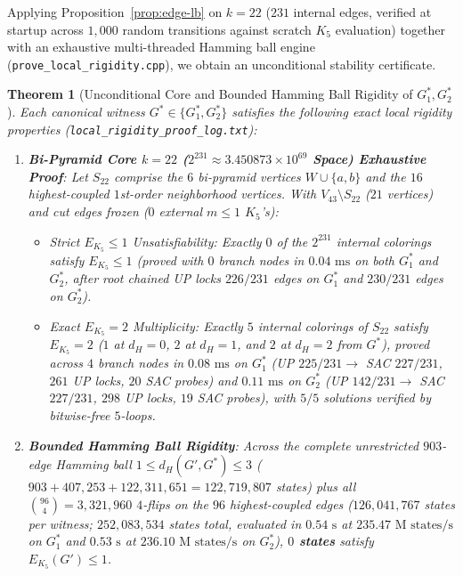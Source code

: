 \documentclass[11pt,a4paper]{article}
\theoremstyle{plain}
\newtheorem{theorem}{Theorem}[section]
\theoremstyle{definition}
\begin{document}
Applying Proposition~\ref{prop:edge-lb} on $k=22$ ($231$ internal edges, verified at startup across $1,000$ random transitions against scratch $K_5$ evaluation) together with an exhaustive multi-threaded Hamming ball engine (\texttt{prove\_\allowbreak local\_\allowbreak rigidity.cpp}), we obtain an unconditional stability certificate.

\begin{theorem}[Unconditional Core and Bounded Hamming Ball Rigidity of $G^*_1, G^*_2$]\label{thm:local-rigidity}
Each canonical witness $G^* \in \{G^*_1, G^*_2\}$ satisfies the following exact local rigidity properties (\texttt{local\_\allowbreak rigidity\_\allowbreak proof\_\allowbreak log.txt}):
\begin{enumerate}
  \item \textbf{Bi-Pyramid Core $k=22$ ($2^{231} \approx 3.450873 \times 10^{69}$ Space) Exhaustive Proof}: Let $S_{22}$ comprise the $6$ bi-pyramid vertices $W \cup \{a,b\}$ and the $16$ highest-coupled $1$st-order neighborhood vertices. With $V_{43} \setminus S_{22}$ ($21$ vertices) and cut edges frozen ($0$ external $m \le 1$ $K_5$'s):
  \begin{itemize}
    \item \emph{Strict $E_{K_5} \le 1$ Unsatisfiability}: Exactly \textbf{$0$} of the $2^{231}$ internal colorings satisfy $E_{K_5} \le 1$ (proved with $0$ branch nodes in $0.04\text{ ms}$ on both $G^*_1$ and $G^*_2$, after root chained UP locks $226/231$ edges on $G^*_1$ and $230/231$ edges on $G^*_2$).
    \item \emph{Exact $E_{K_5} = 2$ Multiplicity}: Exactly \textbf{$5$} internal colorings of $S_{22}$ satisfy $E_{K_5} = 2$ ($1$ at $d_H=0$, $2$ at $d_H=1$, and $2$ at $d_H=2$ from $G^*$), proved across $4$ branch nodes in $0.08\text{ ms}$ on $G^*_1$ (UP $225/231 \to$ SAC $227/231$, $261$ UP locks, $20$ SAC probes) and $0.11\text{ ms}$ on $G^*_2$ (UP $142/231 \to$ SAC $227/231$, $298$ UP locks, $19$ SAC probes), with $5/5$ solutions verified by bitwise-free $5$-loops.
  \end{itemize}
  \item \textbf{Bounded Hamming Ball Rigidity}: Across the complete unrestricted $903$-edge Hamming ball $1 \le d_H(G', G^*) \le 3$ ($903 + 407,253 + 122,311,651 = 122,719,807$ states) plus all $\binom{96}{4} = 3,321,960$ $4$-flips on the $96$ highest-coupled edges ($126,041,767$ states per witness; $252,083,534$ states total, evaluated in $0.54\text{ s}$ at $235.47\text{ M states/s}$ on $G^*_1$ and $0.53\text{ s}$ at $236.10\text{ M states/s}$ on $G^*_2$), \textbf{$0$ states} satisfy $E_{K_5}(G') \le 1$.
\end{enumerate}
\end{theorem}
\end{document}
